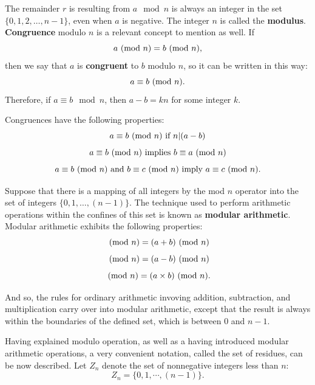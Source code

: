 The remainder $r$ is resulting from $a \mod n$ is always an integer in the set $\{0, 1, 2, \dots, n-1\}$, even when $a$ is negative. The integer $n$ is called the \textbf{modulus}. 
\noindent \textbf{Congruence} modulo $n$ is a relevant concept to mention as well. If
\begin{equation}
  a \ (\text{mod}\ n) = b \ (\text{mod}\ n),
\end{equation}
\noindent then we say that $a$ is \textbf{congruent} to $b$ modulo $n$, so it can be written in this way:
\begin{equation}
a \equiv b \ (\text{mod}\ n).
\end{equation}
Therefore, if $a \equiv b \mod n$, then $a-b=kn$ for some integer $k$. 

Congruences have the following properties:
\begin{equation}
  a \equiv b \ (\text{mod}\ n) \text{ if } n|(a-b)
\end{equation}
\begin{equation}
  a \equiv b \ (\text{mod}\ n) \text{ implies } b \equiv a \ (\text{mod}\ n)
\end{equation}
\begin{equation}
  a \equiv b \ (\text{mod}\ n) \text{ and } b \equiv c \ (\text{mod}\ n) \text{ imply } a \equiv c \ (\text{mod}\ n).
\end{equation}

Suppose that there is a mapping of all integers by the mod $n$ operator into the set of integers $\{0, 1, \dots, (n-1)\}$. The technique used to perform arithmetic operations within the confines of this set is known as \textbf{modular arithmetic}. Modular arithmetic exhibits the following properties:
\begin{equation}
  [(a \Mod{n}) + (b \Mod{n})] \Mod{n} = (a + b) \Mod{n}
\end{equation}
\begin{equation}
  [(a \Mod{n}) - (b \Mod{n})] \Mod{n} = (a - b) \Mod{n}
\end{equation}
\begin{equation}
  [(a \Mod{n}) \times (b \Mod{n})] \Mod{n} = (a \times b) \Mod{n}.
\end{equation}

And so, the rules for ordinary arithmetic invoving addition, subtraction, and multiplication carry over into modular arithmetic, except that the result is always within the boundaries of the defined set, which is between 0 and $n-1$.

Having explained modulo operation, as well as a having introduced modular arithmetic operations, a very convenient notation, called the set of residues, can be now described. Let $Z_{n}$ denote the set of nonnegative integers less than $n$:
\begin{equation}
Z_{n} = \{0,1,\cdots, (n-1)\}.
\end{equation}

